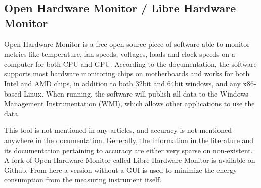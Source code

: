 \subsection{Open Hardware Monitor / Libre Hardware Monitor}

Open Hardware Monitor is a free open-source piece of software able to monitor metrics like temperature, fan speeds, voltages, loads and clock speeds on a computer for both CPU and GPU. According to the documentation, the software supports most hardware monitoring chips on motherboards and works for both Intel and AMD chips, in addition to both 32bit and 64bit windows, and any x86-based Linux. When running, the software will publish all data to the Windows Management Instrumentation (WMI), which allows other applications to use the data.\cite[]{open_hardware_monitor}

This tool is not mentioned in any articles, and accuracy is not mentioned anywhere in the documentation. Generally, the information in the literature and its documentation pertaining to accuracy are either very sparse on non-existent. A fork of Open Hardware Monitor called Libre Hardware Monitor is available on Github\cite*{libre_hardware_monitor}. From here a version without a GUI is used to minimize the energy consumption from the measuring instrument itself.